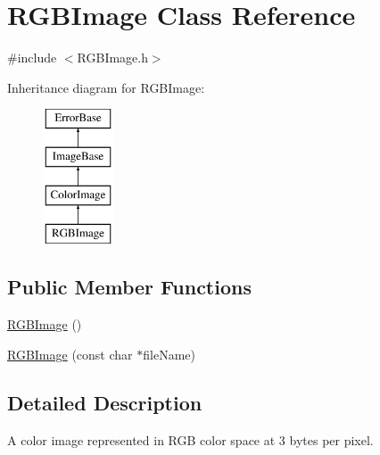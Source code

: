 \hypertarget{classRGBImage}{
\section{RGBImage Class Reference}
\label{classRGBImage}
}


{\ttfamily \#include $<$RGBImage.h$>$}

Inheritance diagram for RGBImage:\begin{figure}[H]
\begin{center}
\leavevmode
\includegraphics[height=4.000000cm]{classRGBImage}
\end{center}
\end{figure}
\subsection*{Public Member Functions}
\begin{DoxyCompactItemize}
\item 
\hyperlink{classRGBImage_a1f3ecdd9e0e080e2b10f7400a7a652a6}{RGBImage} ()
\item 
\hyperlink{classRGBImage_aa4713ec81c2dd1d409094deb88bb0c8b}{RGBImage} (const char $\ast$fileName)
\end{DoxyCompactItemize}


\subsection{Detailed Description}
A color image represented in RGB color space at 3 bytes per pixel. 

